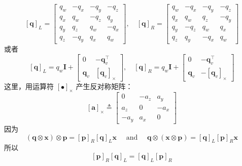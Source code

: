 \begin{equation}
\label{eqn:2.28}
[\mathbf{q}]_{L}=\left[ \begin{array}{cccc}{q_{w}} & {-q_{x}} & {-q_{y}} & {-q_{z}} \\ {q_{x}} & {q_{w}} & {-q_{z}} & {q_{y}} \\ {q_{y}} & {q_{z}} & {q_{w}} & {-q_{x}} \\ {q_{z}} & {-q_{y}} & {q_{x}} & {q_{w}}\end{array}\right], \quad[\mathbf{q}]_{R}=\left[ \begin{array}{cccc}{q_{w}} & {-q_{x}} & {-q_{y}} & {-q_{z}} \\ {q_{x}} & {q_{w}} & {q_{z}} & {-q_{y}} \\ {q_{y}} & {-q_{z}} & {q_{w}} & {q_{x}} \\ {q_{z}} & {q_{y}} & {-q_{x}} & {q_{w}}\end{array}\right]
\end{equation}
或者
\begin{equation}
\label{eqn:2.29}
[\mathbf{q}]_{L}=q_{w} \mathbf{I}+\left[ \begin{array}{cc}{0} & {-\mathbf{q}_{v}^{\top}} \\ {\mathbf{q}_{v}} & {\left[\mathbf{q}_{v}\right]_{ \times}}\end{array}\right], \quad[\mathbf{q}]_{R}=q_{w} \mathbf{I}+\left[ \begin{array}{cc}{0} & {-\mathbf{q}_{v}^{\top}} \\ {\mathbf{q}_{v}} & {-\left[\mathbf{q}_{v}\right]_{ \times}}\end{array}\right]
\end{equation}
这里，用运算符 $[\bullet]_{\times} $ 产生反对称矩阵：
\begin{equation}
\label{eqn:2.30}
[\mathbf{a}]_{ \times} \triangleq \left[ \begin{array}{ccc}{0} & {-a_{z}} & {a_{y}} \\ {a_{z}} & {0} & {-a_{x}} \\ {-a_{y}} & {a_{x}} & {0}\end{array}\right]
\end{equation}
因为
\begin{equation}
\label{eqn:2.31}
(\mathbf{q} \otimes \mathbf{x}) \otimes \mathbf{p}=[\mathbf{p}]_{R}[\mathbf{q}]_{L} \mathbf{x} \quad \text { and } \quad \mathbf{q} \otimes(\mathbf{x} \otimes \mathbf{p})=[\mathbf{q}]_{L}[\mathbf{p}]_{R} \mathbf{x}
\end{equation}
所以
\begin{equation}
\label{eqn:2.32}
[\mathbf{p}]_{R}[\mathbf{q}]_{L}=[\mathbf{q}]_{L}[\mathbf{p}]_{R}
\end{equation}
